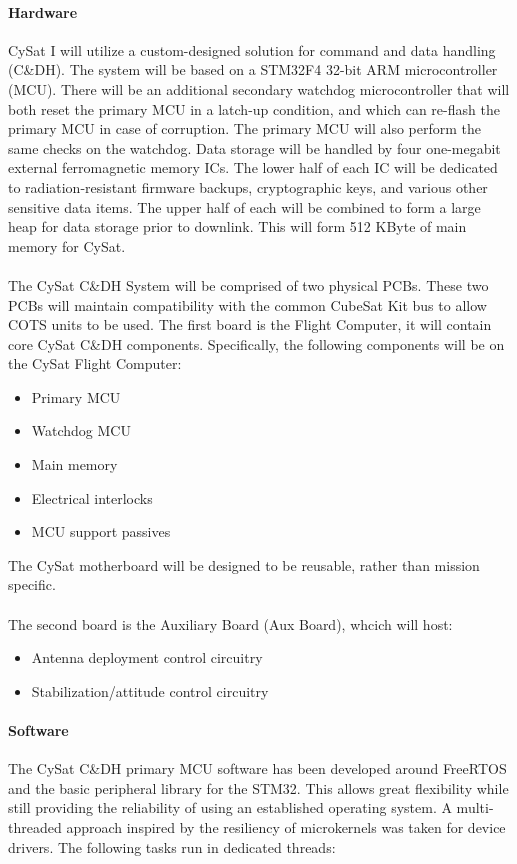 \documentclass[nocover]            %
{CSLI}                       %
\begin{document}
\paragraph{Hardware\\}
CySat I will utilize a custom-designed solution for command and data handling (C\&DH). The system will be based on a STM32F4 32-bit ARM microcontroller (MCU). There will be an additional secondary watchdog microcontroller that will both reset the primary MCU in a latch-up condition, and which can re-flash the primary MCU in case of corruption. The primary MCU will also perform the same checks on the watchdog. Data storage will be handled by four one-megabit external ferromagnetic memory ICs. The lower half of each IC will be dedicated to radiation-resistant firmware backups, cryptographic keys, and various other sensitive data items. The upper half of each will be combined to form a large heap for data storage prior to downlink. This will form 512 KByte of main memory for CySat.\\
\\The CySat C\&DH System will be comprised of two physical PCBs. These two PCBs will maintain compatibility with the common CubeSat Kit bus to allow COTS units to be used. The first board is the Flight Computer, it will contain core CySat C\&DH components. Specifically, the following components will be on the CySat Flight Computer:
\begin{itemize}
\item Primary MCU
\item Watchdog MCU
\item Main memory
\item Electrical interlocks
\item MCU support passives
\end{itemize}
The CySat motherboard will be designed to be reusable, rather than mission specific.\\
\\The second board is the Auxiliary Board (Aux Board), whcich will host:
\begin{itemize}
\item Antenna deployment control circuitry
\item Stabilization/attitude control circuitry
\end{itemize}

\paragraph{Software\\}
The CySat C\&DH primary MCU software has been developed around FreeRTOS and the basic peripheral library for the STM32. This allows great flexibility while still providing the reliability of using an established operating system. A multi-threaded approach inspired by the resiliency of microkernels was taken for device drivers. The following tasks run in dedicated threads:
\end{document}
